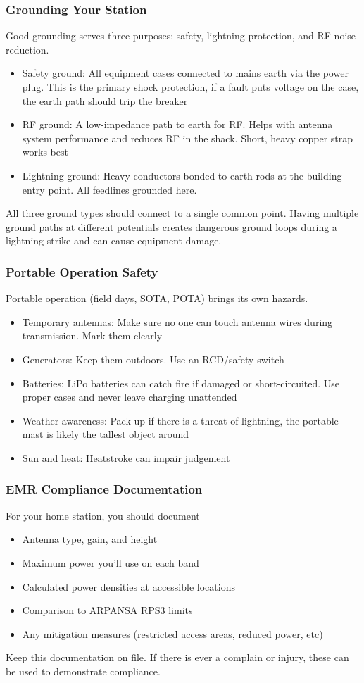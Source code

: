 \documentclass{article}
\begin{document}
\subsubsection{Grounding Your Station}
Good grounding serves three purposes: safety, lightning protection, and RF noise reduction.
\begin{itemize}
    \item Safety ground: All equipment cases connected to mains earth via the power plug. This is the primary shock protection, if a fault puts voltage on the case, the earth path should trip the breaker
    \item RF ground: A low-impedance path to earth for RF. Helps with antenna system performance and reduces RF in the shack. Short, heavy copper strap works best
    \item Lightning ground: Heavy conductors bonded to earth rods at the building entry point. All feedlines grounded here.
\end{itemize}
All three ground types should connect to a single common point. Having multiple ground paths at different potentials creates dangerous ground loops during a lightning strike and can cause equipment damage.

\subsubsection{Portable Operation Safety}
Portable operation (field days, SOTA, POTA) brings its own hazards.
\begin{itemize}
    \item Temporary antennas: Make sure no one can touch antenna wires during transmission. Mark them clearly
    \item Generators: Keep them outdoors. Use an RCD/safety switch
    \item Batteries: LiPo batteries can catch fire if damaged or short-circuited. Use proper cases and never leave charging unattended
    \item Weather awareness: Pack up if there is a threat of lightning, the portable mast is likely the tallest object around
    \item Sun and heat: Heatstroke can impair judgement
\end{itemize}

\subsubsection{EMR Compliance Documentation}
For your home station, you should document
\begin{itemize}
    \item Antenna type, gain, and height
    \item Maximum power you'll use on each band
    \item Calculated power densities at accessible locations
    \item Comparison to ARPANSA RPS3 limits
    \item Any mitigation measures (restricted access areas, reduced power, etc)
\end{itemize}

Keep this documentation on file. If there is ever a complain or injury, these can be used to demonstrate compliance.
\end{document}
